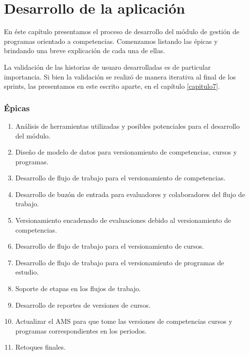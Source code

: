 \chapter{Desarrollo de la aplicación} %
\label{capitulo5} %
En éste capítulo presentamos el proceso de desarrollo del módulo de gestión de programas orientado a competencias. Comenzamos listando las épicas y brindando una breve explicación de cada una de ellas.

La validación de las historias de usuaro desarrolladas es de particular importancia. Si bien la validación se realizó de manera iterativa al final de los sprints, las presentamos en este escrito aparte, en el capítulo \ref{capitulo7}.

\subsection*{Épicas}
\begin{enumerate}
	\item Análisis de herramientas utilizadas y posibles potenciales para el desarrollo del módulo.
	\item Diseño de modelo de datos para versionamiento de competencias, cursos y programas.
	\item Desarrollo de flujo de trabajo para el versionamiento de competencias.
	\item Desarrollo de buzón de entrada para evaluadores y colaboradores del flujo de trabajo.
	\item Versionamiento encadenado de evaluaciones debido al versionamiento de competencias.
	\item Desarrollo de flujo de trabajo para el versionamiento de cursos.
	\item Desarrollo de flujo de trabajo para el versionamiento de programas de estudio.
 	\item Soporte de etapas en los flujos de trabajo.
	\item Desarrollo de reportes de versiones de cursos.
	\item Actualizar el AMS para que tome las versiones de competencias cursos y programas correspondientes en los periodos.
	\item Retoques finales.
\end{enumerate}

